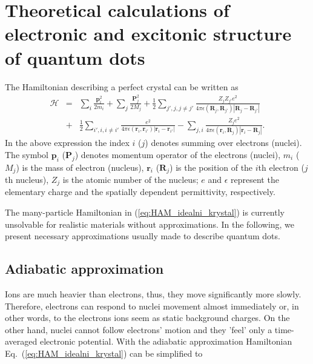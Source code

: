 
\chapter{Theoretical calculations of electronic and excitonic structure of quantum dots}\label{chap:theory}

The Hamiltonian describing a perfect crystal can be written as 
\begin{eqnarray}
\mathcal{H}& =& \sum_{i}\frac{\mathbf{p}_i ^2}{2m_i} + \sum_{j}\frac{\mathbf{P}_j^2}{2M_j}+ \frac{1}{2}\sum_{j', j, j\neq j'}   \frac{Z_j Z_{j'}e^2}{4\pi \epsilon(\mathbf{R}_j, \mathbf{R}_{j'}) |\mathbf{R}_j-\mathbf{R}_{j'}|}  \nonumber \\
&+&\frac{1}{2}\sum_{i', i, i\neq i'} \frac{e^2}{4\pi \epsilon(\mathbf{r}_i, \mathbf{r}_{i'}) |\mathbf{r}_i-\mathbf{r}_{i'}|} - \sum_{j, i} \frac{Z_j e^2}{4\pi \epsilon(\mathbf{r}_i, \mathbf{R}_{j}) |\mathbf{r}_i-\mathbf{R}_{j}|}. \label{eq:HAM_idealni_krystal}
\end{eqnarray}
In the above expression the index $i$ ($j$) denotes summing over electrons (nuclei). The symbol $\mathbf{p}_i$ ($\mathbf{P}_j$) denotes momentum operator of the electrons (nuclei), $m_i$ ($M_j$) is the mass of electron (nucleus), $\mathbf{r}_i$ ($\mathbf{R}_j$) is the position of the $i$th electron ($j$th nucleus), $Z_j$ is the atomic number of the nucleus; $e$ and $\epsilon$ represent the elementary charge and the spatially dependent permittivity, respectively.

The many-particle Hamiltonian in (\ref{eq:HAM_idealni_krystal}) is currently unsolvable for realistic materials without approximations. In the following, we present necessary approximations usually made to describe quantum dots.

\section{Adiabatic approximation}
Ions are much heavier than electrons, thus, they move significantly more slowly. %
Therefore, electrons can respond to nuclei movement almost immediately or, in other words, to the electrons ions seem as static background charges. On the other hand, nuclei cannot follow electrons' motion and they 'feel' only a time-averaged electronic potential. With the adiabatic approximation Hamiltonian Eq.~(\ref{eq:HAM_idealni_krystal}) can be simplified to

